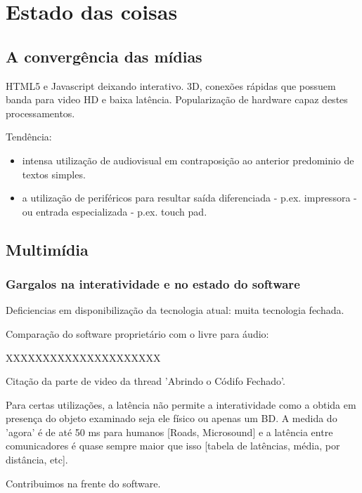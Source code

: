 \section{Estado das coisas}
\label{sec:context}


\subsection{A convergência das mídias}
\label{sec:midiamultimidia}

HTML5 e Javascript deixando interativo. 3D, conexões rápidas que possuem banda para video HD e
baixa latência. Popularização de hardware capaz destes processamentos.

Tendência: 
\begin{itemize}
    \item intensa utilização de audiovisual em contraposição ao
anterior predominio de textos simples.
    \item a utilização de periféricos para resultar saída diferenciada - p.ex.
impressora - ou entrada especializada - p.ex. touch pad.
\end{itemize}


\subsection{Multimídia}

\subsubsection{Gargalos na interatividade e no estado do software}
\label{sec:gargalos}

Deficiencias em disponibilização da tecnologia atual: muita
tecnologia fechada.

Comparação do software proprietário com o livre para áudio:

XXXXXXXXXXXXXXXXXXXXX

Citação da parte de video da thread 'Abrindo o Códifo Fechado'.

Para certas utilizações, a latência não permite a interatividade como 
a obtida em presença do objeto examinado seja ele físico ou apenas um BD.
A medida do 'agora' é de até 50 ms para humanos [Roads, Microsound] e a latência entre comunicadores é
quase sempre maior que isso [tabela de latências, média, por distância, etc].

Contribuimos na frente do software.


